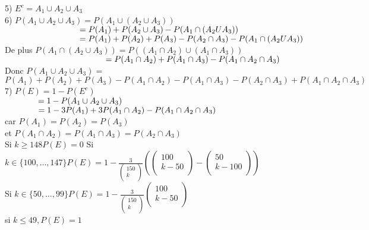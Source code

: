 \documentclass{article}
\newcommand\tab[1][1cm]{\hspace*{#1}}
\begin{document}
5) $E^c = A_1 \cup A_2 \cup A_3$\\
6) $P(A_1 \cup A_2 \cup A_3) = P(A_1 \cup (A_2 \cup A_3))$\\
$\tab[3.15cm] = P(A_1) + P(A_2 \cup A_3) - P(A_1 \cap (A_2 U A_3))$\\
$\tab[3.15cm] = P(A_1) + P(A_2) + P(A_3) - P(A_2 \cap A_3) - P(A_1 \cap (A_2 U A_3))$\\
De plus $P(A_1 \cap (A_2 \cup A_3)) = P((A_1 \cap A_2) \cup (A_1 \cap A_3))$\\
$\tab[4.25cm] = P(A_1 \cap A_2) + P(A_1 \cap A_3) - P(A_1 \cap A_2 \cap A_3)$\\
Donc $P(A_1 \cup A_2 \cup A_3) =$\\
$P(A_1) + P(A_2) + P(A_3) - P(A_1 \cap A_2) - P(A_1 \cap A_3) - P(A_2 \cap A_3) + P(A_1 \cap A_2 \cap A_3)$\\
7) $P(E) = 1 - P(E^c)$\\
$\tab[1.4cm] = 1 - P(A_1 \cup A_2 \cup A_3)$\\
$\tab[1.4cm] = 1 - 3 P(A_1) + 3 P(A_1 \cap A_2) - P(A_1 \cap A_2 \cap A_3)$\\
car $P(A_1) = P(A_2) = P(A_3)$\\
et $P(A_1 \cap A_2) = P(A_1 \cap A_3) = P(A_2 \cap A_3)$\\
Si $k \geq 148 P(E) = 0$
Si $k \in \{100, \dots, 147\} P(E) = 1 - \frac{3}{\begin{pmatrix}
    150\\
    k\\
\end{pmatrix}} \left(
    \begin{pmatrix}
        100\\
        k - 50\\
    \end{pmatrix} - \begin{pmatrix}
        50\\
        k - 100\\
    \end{pmatrix}
\right)$\\
Si $k \in \{50, \dots, 99\} P(E) = 1 - \frac{3}{\begin{pmatrix}
    150\\
    k\\
\end{pmatrix}} \begin{pmatrix}
    100\\
    k - 50\\
\end{pmatrix}$\\
si $k \leq 49, P(E) = 1$
\end{document}
